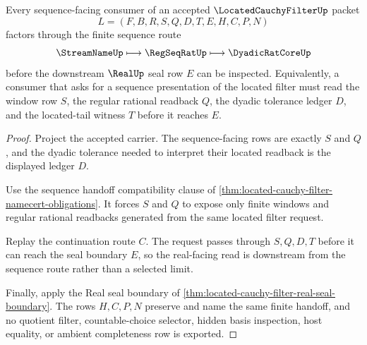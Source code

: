 \begin{theorem}
\label{thm:located-cauchy-filter-regular-sequence-handoff}
Every sequence-facing consumer of an accepted $\LocatedCauchyFilterUp$ packet
$$
L=(F,B,R,S,Q,D,T,E,H,C,P,N)
$$
factors through the finite sequence route
$$
\StreamNameUp \longmapsto \RegSeqRatUp \longmapsto \DyadicRatCoreUp
$$
before the downstream $\RealUp$ seal row $E$ can be inspected. Equivalently, a consumer that asks for a sequence presentation of the located filter must read the window row $S$, the regular rational readback $Q$, the dyadic tolerance ledger $D$, and the located-tail witness $T$ before it reaches $E$.
\end{theorem}
\begin{proof}
Project the accepted carrier. The sequence-facing rows are exactly $S$ and $Q$, and the dyadic tolerance needed to interpret their located readback is the displayed ledger $D$.

Use the sequence handoff compatibility clause of \autoref{thm:located-cauchy-filter-namecert-obligations}. It forces $S$ and $Q$ to expose only finite windows and regular rational readbacks generated from the same located filter request.

Replay the continuation route $C$. The request passes through $S,Q,D,T$ before it can reach the seal boundary $E$, so the real-facing read is downstream from the sequence route rather than a selected limit.

Finally, apply the Real seal boundary of \autoref{thm:located-cauchy-filter-real-seal-boundary}. The rows $H,C,P,N$ preserve and name the same finite handoff, and no quotient filter, countable-choice selector, hidden basis inspection, host equality, or ambient completeness row is exported.
\end{proof}

